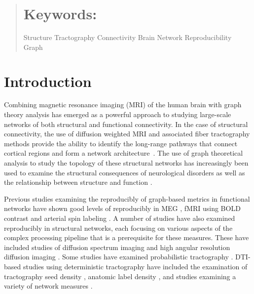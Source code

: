 \documentclass{frontiersSCNS} %
\begin{document}
\begin{abstract}

\tiny
  \section{Keywords:} Structure Tractography Connectivity Brain Network Reproducibility Graph  %
\end{abstract}


\section{Introduction}
Combining magnetic resonance imaging (MRI) of the human brain with graph
theory analysis has emerged as a powerful approach to studying
large-scale networks of both structural and functional
connectivity. In the case of structural connectivity, the use of diffusion weighted MRI and
associated fiber tractography methods provide the ability to identify
the long-range pathways that connect cortical regions and form a
network architecture~\citep{Basser2000,Lazar2003,Hagmann2003,Mori1999}. 
The use of graph theoretical analysis to study
the topology of these structural networks has increasingly been used to
examine the structural consequences of neurological disorders \citep{Xie2012,Basset2012}
as well as the relationship between structure and function \citep{}. 

Previous studies examining the reproducibly of graph-based metrics in
functional networks have shown good levels of reproducibly in MEG
\citep{Deuker2009}, fMRI using BOLD contrast
\citep{Telesford2010,Braun2012,Schwarz2011,Liang2012,Weber2013} and
arterial spin labeling \citep{Weber2013}. A number of studies have also examined
reproducibly in structural networks, each focusing on various aspects
of the complex processing pipeline that is a prerequisite for these
measures. These have included studies of diffusion spectrum imaging
\citep{Cammoun2012,Bassett2011N} and high angular resolution diffusion
imaging \citep{Dennis2012}. Some studies have examined probabilistic
tractography \citep{Owen2013BC,Vaessen2010}. DTI-based studies using
deterministic tractography have included the examination of
tractography seed density \citep{Cheng2012N}, anatomic label density
\citep{Bassett2011N}, and studies examining a variety of network
measures \citep{Cheng2012N,Irimia2012N}. 
\end{document}
